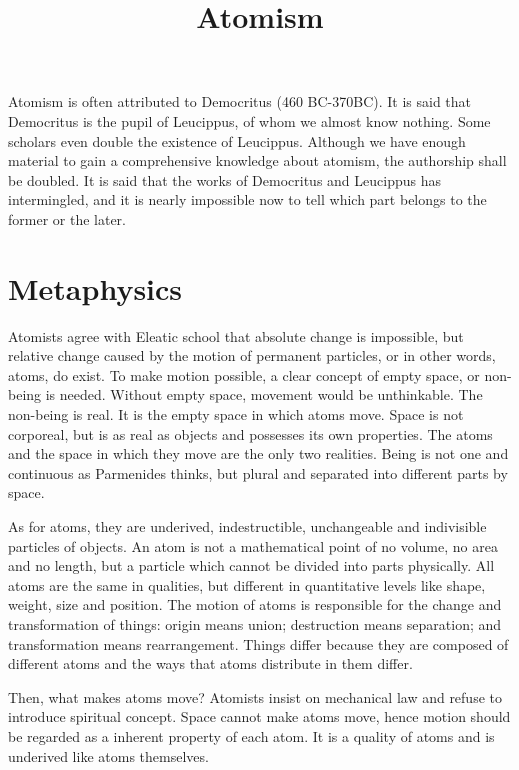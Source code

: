 \documentclass[11pt]{article}
\title{Atomism}
\date{}
\begin{document}
  \maketitle
  
  \newpage

  \linenumbers
Atomism is often attributed to Democritus (460 BC-370BC). 
It is said that Democritus is the pupil of Leucippus, of whom we almost know nothing. 
Some scholars even double the existence of Leucippus. 
Although we have enough material to gain a comprehensive knowledge about atomism, the authorship shall be doubled. 
It is said that the works of Democritus and Leucippus has intermingled, and it is nearly impossible now to tell which part belongs to the former or the later.

\section{Metaphysics} 
Atomists agree with Eleatic school that absolute change is impossible, but relative change caused by the motion of permanent particles, or in other words, atoms, do exist. 
To make motion possible, a clear concept of empty space, or non-being is needed. 
Without empty space, movement would be unthinkable. 
The non-being is real. 
It is the empty space in which atoms move. 
Space is not corporeal, but is as real as objects and possesses its own properties. 
The atoms and the space in which they move are the only two realities. 
Being is not one and continuous as Parmenides thinks, but plural and separated into different parts by space. 

\newline

As for atoms, they are underived, indestructible, unchangeable and indivisible particles of objects. 
An atom is not a mathematical point of no volume, no area and no length, but a particle which cannot be divided into parts physically. 
All atoms are the same in qualities, but different in quantitative levels like shape, weight, size and position. 
The motion of atoms is responsible for the change and transformation of things: 
origin means union; 
destruction means separation; 
and transformation means rearrangement. 
Things differ because they are composed of different atoms and the ways that atoms distribute in them differ.

\newline

Then, what makes atoms move? 
Atomists insist on mechanical law and refuse to introduce spiritual concept. 
Space cannot make atoms move, hence motion should be regarded as a inherent property of each atom. 
It is a quality of atoms and is underived like atoms themselves.
  
\end{document}
